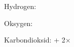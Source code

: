 \documentclass{article}
\begin{document}
Hydrogen: \awH

Oksygen: \awO

Karbondioksid: \awC + 2×\awO
\end{document}
